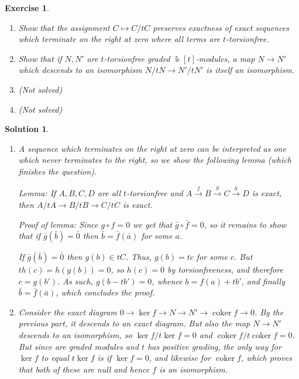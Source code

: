 \documentclass{article}
\newtheorem{ex}{Exercise}
\theoremstyle{nonumberplain}
\newtheorem{sol}{Solution}
\newcommand{\kk}{\Bbbk}
\DeclareMathOperator{\coker}{coker}
\begin{document}
\begin{ex}
\leavevmode
\begin{enumerate}
\item Show that the assignment $C \mapsto C/tC$ preserves exactness of exact sequences which terminate on the right at zero where all terms are $t$-torsionfree.

\item Show that if $N,N'$ are $t$-torsionfree graded $\kk[t]$-modules, a map $N \to N'$ which descends to an isomorphism $N/tN \to N'/tN'$ is itself an isomorphism.

\item (Not solved)

\item (Not solved)
\end{enumerate}
\end{ex}

\begin{sol}
\leavevmode
\begin{enumerate}
\item A sequence which terminates on the right at zero can be interpreted as one which never terminates to the right, so we show the following lemma (which finishes the question).

Lemma: If $A,B,C,D$ are all $t$-torsionfree and $A \xrightarrow f B \xrightarrow g C \xrightarrow h D$ is exact, then $A/tA \to B/tB \to C/tC$ is exact.

Proof of lemma: Since $g \circ f = 0$ we get that $\bar g \circ \bar f = 0$, so it remains to show that if $\bar g(\bar b) = \bar 0$ then $\bar b = \bar f(\bar a)$ for some $a$.

If $\bar g(\bar b) = \bar 0$ then $g(b) \in t C$. Thus, $g(b) = tc$ for some $c$. But $t h(c) = h(g(b)) = 0$, so $h(c) = 0$ by torsionfreeness, and therefore $c = g(b')$. As such, $g(b - tb') = 0$, whence $b = f(a) + tb'$, and finally $\bar b = \bar f(\bar a)$, which concludes the proof.

\item Consider the exact diagram $0 \to \ker f \to N \to N' \to \coker f \to 0$. By the previous part, it descends to an exact diagram. But also the map $N \to N'$ descends to an isomorphism, so $\ker f / t \ker f = 0$ and $\coker f / t \coker f = 0$. But since are graded modules and $t$ has positive grading, the only way for $\ker f$ to equal $t \ker f$ is if $\ker f = 0$, and likewise for $\coker f$, which proves that both of these are null and hence $f$ is an isomorphism.
\end{enumerate}
\end{sol}
\end{document}
